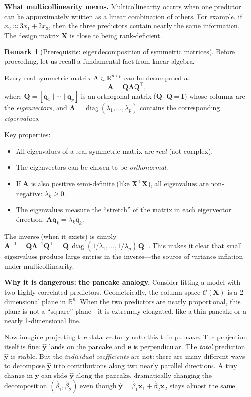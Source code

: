\documentclass[11pt,a4paper]{article}
\theoremstyle{plain}
\theoremstyle{definition}
\newtheorem{remark}[theorem]{Remark}
\newcommand{\R}{\mathbb{R}}
\newcommand{\yhat}{\hat{\bm{y}}}
\newcommand{\bX}{\bm{X}}
\newcommand{\by}{\bm{y}}
\newcommand{\be}{\bm{e}}
\newcommand{\bI}{\bm{I}}
\newcommand{\bQ}{\bm{Q}}
\newcommand{\Col}{\mathcal{C}}
\DeclareMathOperator{\diag}{diag}
\begin{document}
\medskip
\noindent\textbf{What multicollinearity means.}
Multicollinearity occurs when one predictor can be approximately written as a linear combination of others.
For example, if $x_2 \approx 3x_1 + 2x_3$, then the three predictors contain nearly the same information.
The design matrix $\bX$ is close to being rank-deficient.

\medskip
\begin{remark}[Prerequisite: eigendecomposition of symmetric matrices]
Before proceeding, let us recall a fundamental fact from linear algebra.

Every real symmetric matrix $\bm{A} \in \R^{p \times p}$ can be
decomposed as
\[
  \bm{A} = \bQ \bm{\Lambda} \bQ^\top,
\]
where $\bQ = [\bm{q}_1 \mid \cdots \mid \bm{q}_p]$ is an orthogonal
matrix ($\bQ^\top \bQ = \bI$) whose columns are the \emph{eigenvectors},
and $\bm{\Lambda} = \diag(\lambda_1, \dots, \lambda_p)$ contains the
corresponding \emph{eigenvalues}.

Key properties:
\begin{itemize}[nosep]
  \item All eigenvalues of a real symmetric matrix are \emph{real}
        (not complex).
  \item The eigenvectors can be chosen to be \emph{orthonormal}.
  \item If $\bm{A}$ is also positive semi-definite (like $\bX^\top\bX$),
        all eigenvalues are non-negative: $\lambda_k \ge 0$.
  \item The eigenvalues measure the ``stretch'' of the matrix in each
        eigenvector direction: $\bm{A}\bm{q}_k = \lambda_k \bm{q}_k$.
\end{itemize}

The inverse (when it exists) is simply
$\bm{A}^{-1} = \bQ \bm{\Lambda}^{-1} \bQ^\top
= \bQ \, \diag(1/\lambda_1, \dots, 1/\lambda_p) \, \bQ^\top$.
This makes it clear that small eigenvalues produce large entries in the
inverse---the source of variance inflation under multicollinearity.
\end{remark}

\medskip
\noindent\textbf{Why it is dangerous: the pancake analogy.}
Consider fitting a model with two highly correlated predictors.
Geometrically, the column space $\Col(\bX)$ is a 2-dimensional plane in $\R^n$.
When the two predictors are nearly proportional, this plane is not a ``square'' plane---it is extremely elongated, like a thin pancake or a nearly 1-dimensional line.

Now imagine projecting the data vector $\by$ onto this thin pancake.
The projection itself is fine: $\yhat$ lands on the pancake and $\be$ is perpendicular.
The \emph{total} prediction $\yhat$ is stable.
But the \emph{individual coefficients} are not: there are many different ways to decompose $\yhat$ into contributions along two nearly parallel directions.
A tiny change in $\by$ can slide $\yhat$ along the pancake, dramatically changing the decomposition $(\hat{\beta}_1, \hat{\beta}_2)$ even though $\yhat = \hat{\beta}_1\bm{x}_1 + \hat{\beta}_2\bm{x}_2$ stays almost the same.
\end{document}
